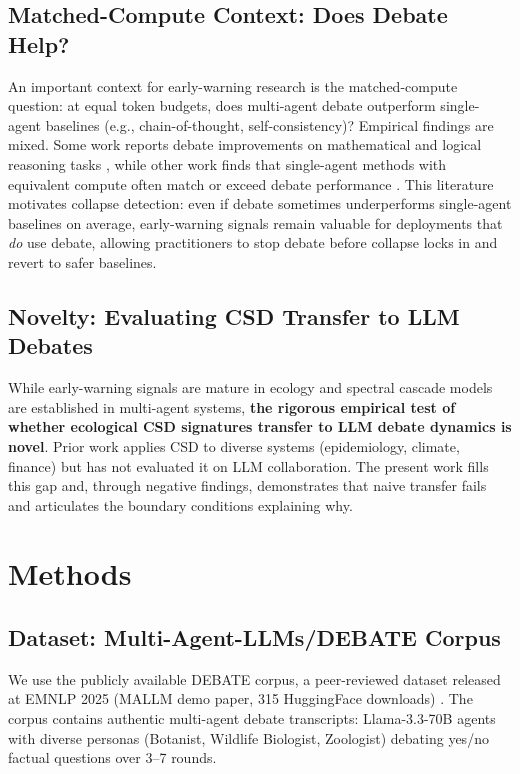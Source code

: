 \documentclass[11pt,letterpaper]{article}
\begin{document}
\subsection{Matched-Compute Context: Does Debate Help?}

An important context for early-warning research is the matched-compute question: at equal token budgets, does multi-agent debate outperform single-agent baselines (e.g., chain-of-thought, self-consistency)? Empirical findings are mixed. Some work reports debate improvements on mathematical and logical reasoning tasks \citep{Li2026,Wu2025}, while other work finds that single-agent methods with equivalent compute often match or exceed debate performance \citep{Wang2025Scaling}. This literature motivates collapse detection: even if debate sometimes underperforms single-agent baselines on average, early-warning signals remain valuable for deployments that \emph{do} use debate, allowing practitioners to stop debate before collapse locks in and revert to safer baselines.

\subsection{Novelty: Evaluating CSD Transfer to LLM Debates}

While early-warning signals are mature in ecology and spectral cascade models are established in multi-agent systems, \textbf{the rigorous empirical test of whether ecological CSD signatures transfer to LLM debate dynamics is novel}. Prior work applies CSD to diverse systems (epidemiology, climate, finance) but has not evaluated it on LLM collaboration. The present work fills this gap and, through negative findings, demonstrates that naive transfer fails and articulates the boundary conditions explaining why.

\section{Methods}

\subsection{Dataset: Multi-Agent-LLMs/DEBATE Corpus}

We use the publicly available DEBATE corpus, a peer-reviewed dataset released at EMNLP 2025 (MALLM demo paper, 315 HuggingFace downloads) \citep{Min2025Debate}. The corpus contains authentic multi-agent debate transcripts: Llama-3.3-70B agents with diverse personas (Botanist, Wildlife Biologist, Zoologist) debating yes/no factual questions over 3--7 rounds.
\end{document}
